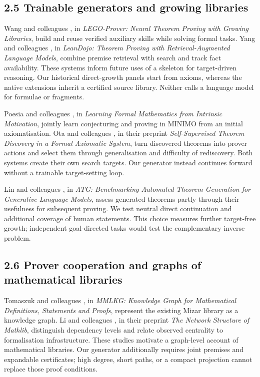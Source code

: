 \documentclass[pdflatex,sn-basic,Numbered]{sn-jnl}
\begin{document}
\subsection*{2.5 Trainable generators and growing libraries}\label{trainable-generators-and-growing-libraries}

Wang and colleagues \citep{WangEtAl2023Lego}, in \emph{LEGO-Prover: Neural Theorem Proving with Growing Libraries}, build and reuse verified auxiliary skills while solving formal tasks. Yang and colleagues \citep{YangEtAl2023}, in \emph{LeanDojo: Theorem Proving with Retrieval-Augmented Language Models}, combine premise retrieval with search and track fact availability. These systems inform future uses of a skeleton for target-driven reasoning. Our historical direct-growth panels start from axioms, whereas the native extensions inherit a certified source library. Neither calls a language model for formulae or fragments.

Poesia and colleagues \citep{PoesiaEtAl2024}, in \emph{Learning Formal Mathematics from Intrinsic Motivation}, jointly learn conjecturing and proving in MINIMO from an initial axiomatisation. Ota and colleagues \citep{OtaEtAl2026}, in their preprint \emph{Self-Supervised Theorem Discovery in a Formal Axiomatic System}, turn discovered theorems into prover actions and select them through generalisation and difficulty of rediscovery. Both systems create their own search targets. Our generator instead continues forward without a trainable target-setting loop.

Lin and colleagues \citep{LinEtAl2024}, in \emph{ATG: Benchmarking Automated Theorem Generation for Generative Language Models}, assess generated theorems partly through their usefulness for subsequent proving. We test neutral direct continuation and additional coverage of human statements. This choice measures further target-free growth; independent goal-directed tasks would test the complementary inverse problem.

\subsection*{2.6 Prover cooperation and graphs of mathematical libraries}\label{prover-cooperation-and-graphs-of-mathematical-libraries}

Tomaszuk and colleagues \citep{TomaszukEtAl2023}, in \emph{MMLKG: Knowledge Graph for Mathematical Definitions, Statements and Proofs}, represent the existing Mizar library as a knowledge graph. Li and colleagues \citep{LiEtAl2026}, in their preprint \emph{The Network Structure of Mathlib}, distinguish dependency levels and relate observed centrality to formalisation infrastructure. These studies motivate a graph-level account of mathematical libraries. Our generator additionally requires joint premises and expandable certificates; high degree, short paths, or a compact projection cannot replace those proof conditions.
\end{document}
